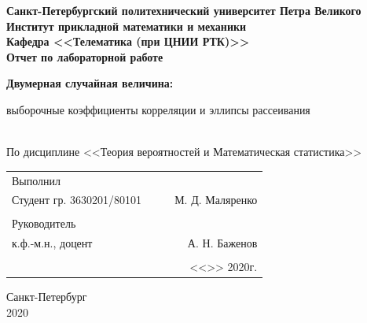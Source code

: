 \documentclass[12pt]{article}
\begin{document}
\begin{titlepage}
	\begin{center}
		\hfill \break
		{\textbf{Санкт-Петербургский политехнический университет Петра Великого}}\\
		\hfill \break
		\textbf{Институт прикладной математики и механики}\\
		 \hfill \break
		\textbf{Кафедра <<Телематика (при ЦНИИ РТК)>>}\\
		\vfill
		\large{\bfseries Отчет по лабораторной работе}\\
		\hfill \break
		\hfill \break
		\hfill \break
		\hfill \break
        \normalsize{\bfseries Двумерная случайная величина:
        
        выборочные коэффициенты корреляции и эллипсы рассеивания}\\
        \hfill \break
		По дисциплине <<Теория вероятностей и Математическая статистика>>\\
		\hfill \break
		\hfill \break
	\end{center}
 
	\normalsize
	{ 
		\begin{tabular}{lp{2cm}cr}
			Выполнил &&&\\
			Студент гр. 3630201/80101&&\underline{\hspace{1.5cm}}& М. Д. Маляренко\\\\
			Руководитель&&&\\ 
			к.ф.-м.н., доцент && \underline{\hspace{1.5cm}}& А. Н. Баженов \\\\
			&&&<<\underline{\phantom{333}}>>\underline{\phantom{сентября000}}
			2020г.
		\end{tabular}
	}
\vfill

\begin{center} Санкт-Петербург \\2020 \end{center}
\end{titlepage}

\newpage

\setcounter{page}{2}
\end{document}
